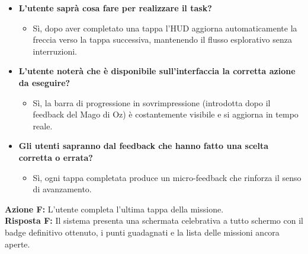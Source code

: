 \begin{itemize}[nosep, leftmargin=1.6em]
    \item \textbf{L'utente saprà cosa fare per realizzare il task?}
    \begin{itemize}[nosep, leftmargin=1.6em]
        \item Sì, dopo aver completato una tappa l'HUD aggiorna automaticamente la freccia verso la tappa successiva, mantenendo il flusso esplorativo senza interruzioni.
    \end{itemize}
    \item \textbf{L'utente noterà che è disponibile sull'interfaccia la corretta azione da eseguire?}
    \begin{itemize}[nosep, leftmargin=1.6em]
        \item Sì, la barra di progressione in sovrimpressione (introdotta dopo il feedback del Mago di Oz) è costantemente visibile e si aggiorna in tempo reale.
    \end{itemize}
    \item \textbf{Gli utenti sapranno dal feedback che hanno fatto una scelta corretta o errata?}
    \begin{itemize}[nosep, leftmargin=1.6em]
        \item Sì, ogni tappa completata produce un micro-feedback che rinforza il senso di avanzamento.
    \end{itemize}
\end{itemize}

\vspace{0.3cm}
\noindent\textbf{Azione F:} L'utente completa l'ultima tappa della missione.\\
\textbf{Risposta F:} Il sistema presenta una schermata celebrativa a tutto schermo con il badge definitivo ottenuto, i punti guadagnati e la lista delle missioni ancora aperte.

